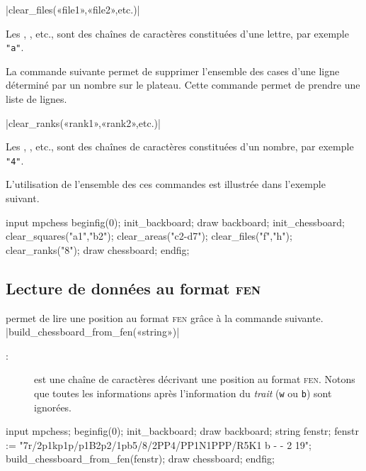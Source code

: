 \documentclass[french]{ltxdoc}
\begin{document}
\commande|clear_files(«file1»,«file2»,etc.)|\smallskip

Les \textbf{}, \textbf{}, etc., sont des chaînes de caractères constituées d’une lettre, par exemple \lstinline+"a"+.
\medskip

La commande suivante permet de supprimer l’ensemble des cases d’une ligne
déterminé par un nombre sur le plateau. Cette commande permet de prendre
une liste de lignes.

\commande|clear_ranks(«rank1»,«rank2»,etc.)|\smallskip

Les \textbf{}, \textbf{}, etc., sont des chaînes de caractères constituées d’un nombre, par exemple \lstinline+"4"+.

L’utilisation de l’ensemble des ces commandes est illustrée dans l’exemple suivant.

\begin{ExempleMP}
input mpchess
beginfig(0);
init_backboard;
draw backboard;
init_chessboard;
clear_squares("a1","b2");
clear_areas("c2-d7");
clear_files("f","h");
clear_ranks("8");
draw chessboard;
endfig;
\end{ExempleMP}



\subsection{Lecture de données au format \textsc{fen}}

\mpchess permet de lire une position au format \textsc{fen} grâce à la commande suivante.
\commande|build_chessboard_from_fen(«string»)|\smallskip

\begin{description}
\item[:] est une chaîne de caractères décrivant une position au
format \textsc{fen}. Notons que toutes les informations après l’information du
\emph{trait} (\texttt{w} ou \texttt{b}) sont ignorées.
\end{description}

\begin{ExempleMP}
input mpchess;
beginfig(0);
init_backboard;
draw backboard;
string fenstr;
fenstr := "7r/2p1kp1p/p1B2p2/1pb5/8/2PP4/PP1N1PPP/R5K1 b - - 2 19";
build_chessboard_from_fen(fenstr);
draw chessboard;
endfig;
\end{ExempleMP}
\end{document}
